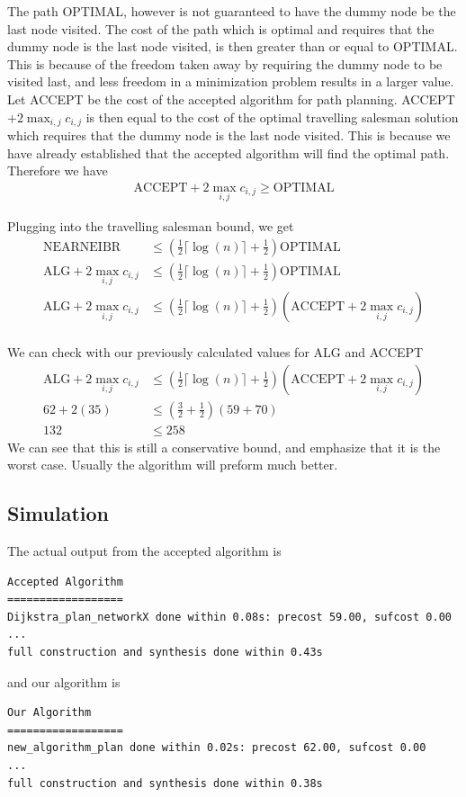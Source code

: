 The path OPTIMAL, however is not guaranteed to have the dummy node be the last node visited. The cost of the path which is optimal and requires that the dummy node is the last node visited, is then greater than or equal to OPTIMAL. This is because of the freedom taken away by requiring the dummy node to be visited last, and less freedom in a minimization problem results in a larger value. Let ACCEPT be the cost of the accepted algorithm for path planning. ACCEPT $+ 2\max_{i,j} c_{i,j}$ is then equal to the cost of the optimal travelling salesman solution which requires that the dummy node is the last node visited. This is because we have already established that the accepted algorithm will find the optimal path. Therefore we have
\begin{align*}
\text{ACCEPT} + 2\max_{i,j} c_{i,j} \geq \text{OPTIMAL}
\end{align*}

Plugging into the travelling salesman bound, we get
\begin{align*}
\text{NEARNEIBR} &\leq (\frac{1}{2} \lceil \log(n) \rceil + \frac{1}{2}) \text{OPTIMAL} \\
\text{ALG} + 2\max_{i,j} c_{i,j} &\leq (\frac{1}{2} \lceil \log(n) \rceil + \frac{1}{2}) \text{OPTIMAL} \\
\text{ALG} + 2\max_{i,j} c_{i,j} &\leq (\frac{1}{2} \lceil \log(n) \rceil + \frac{1}{2}) (\text{ACCEPT} + 2 \max_{i,j} c_{i,j}) \\ 
\end{align*} 


We can check with our previously calculated values for ALG and ACCEPT
\begin{align*}
\text{ALG} + 2\max_{i,j} c_{i,j} &\leq (\frac{1}{2} \lceil \log(n) \rceil + \frac{1}{2}) (\text{ACCEPT} + 2 \max_{i,j} c_{i,j}) \\ 
62 + 2 (35) &\leq (\frac{3}{2} + \frac{1}{2})(59+70) \\
132 &\leq 258
\end{align*}
We can see that this is still a conservative bound, and emphasize that it is the worst case. Usually the algorithm will preform much better.

\subsection{Simulation}
The actual output from the accepted algorithm is 
\begingroup
\fontsize{9pt}{12pt}\selectfont
\begin{lstlisting}
Accepted Algorithm
==================
Dijkstra_plan_networkX done within 0.08s: precost 59.00, sufcost 0.00
...
full construction and synthesis done within 0.43s 
\end{lstlisting}
\endgroup
and our algorithm is 
\begingroup
\fontsize{9pt}{12pt}\selectfont
\begin{lstlisting}
Our Algorithm
==================
new_algorithm_plan done within 0.02s: precost 62.00, sufcost 0.00
...
full construction and synthesis done within 0.38s 
\end{lstlisting}
\endgroup

